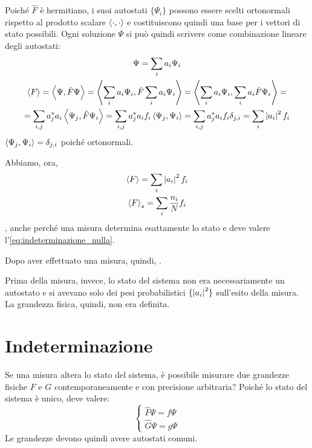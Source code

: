 Poiché $\hat{F}$ è hermitiano, i suoi autostati $\{\Psi_i\}$ possono essere scelti ortonormali rispetto al prodotto scalare $\left\langle \cdot, \cdot \right\rangle$ e costituiscono quindi una base per i vettori di stato possibili.
Ogni soluzione $\Psi$ si può quindi scrivere come combinazione lineare degli autostati:
\begin{gather}
    \Psi = \sum_i a_i \Psi_i \\
\begin{gathered}
    \left\langle F \right\rangle
    = \left\langle \Psi, \hat{F} \Psi \right\rangle
    = \left\langle \sum_i a_i \Psi_i, \hat{F} \sum_i a_i \Psi_i \right\rangle
    = \left\langle \sum_i a_i \Psi_i, \sum_i a_i \hat{F} \Psi_i \right\rangle = \\
    = \sum_{i,j} a_j^* a_i \left\langle \Psi_j, \hat{F} \Psi_i \right\rangle
    = \sum_{i,j} a_j^* a_i f_i \left\langle \Psi_j, \Psi_i \right\rangle
    = \sum_{i,j} a_j^* a_i f_i \delta_{j,i}
    = \sum_i \left\lvert a_i \right\rvert^2 f_i
\end{gathered}
\end{gather}
$\left\langle \Psi_j, \Psi_i \right\rangle = \delta_{j,i}$ poiché ortonormali.

Abbiamo, ora,
\begin{subequations}
\begin{gather}
    \left\langle F \right\rangle = \sum_i \left\lvert a_i \right\rvert^2 f_i \\
    \left\langle F \right\rangle_s = \sum_i \frac{n_i}{N} f_i
\end{gather}
\end{subequations}
, anche perché una misura determina esattamente lo stato e deve valere l'\cref{eq:indeterminazione_nulla}.

Dopo aver effettuato una misura, quindi, .

Prima della misura, invece, lo stato del sistema non era necessariamente un autostato e si avevano solo dei pesi probabilistici $\{\left\lvert a_i \right\rvert^2\}$ sull'esito della misura.
La grandezza fisica, quindi, non era definita.

\section{Indeterminazione}

Se una misura altera lo stato del sistema, è possibile misurare due grandezze fisiche $F$ e $G$ contemporaneamente e con precisione arbitraria?
Poiché lo stato del sistema è unico, deve valere:
\begin{equation}
    \begin{cases}
        \hat{F} \Psi = f \Psi \\
        \hat{G} \Psi = g \Psi
    \end{cases}
\end{equation}
Le grandezze devono quindi avere autostati comuni.

